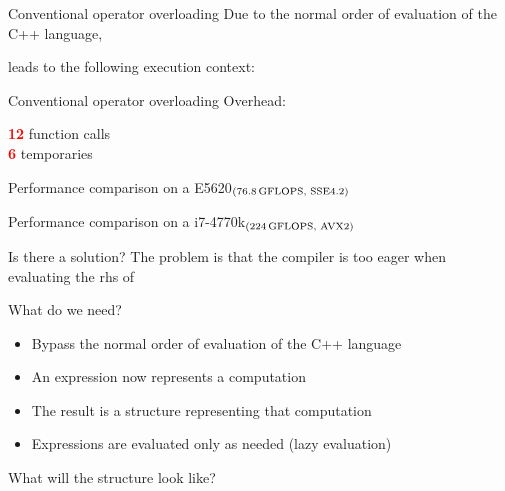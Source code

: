 \documentclass{beamer}
\begin{document}
\begin{frame}{Conventional operator overloading}
	Due to the normal order of evaluation of the C++ language,
	
	
	leads to the following execution context:
	
\end{frame}

\begin{frame}{Conventional operator overloading}
	Overhead: \\
	\begin{center}
		\textcolor{red}{\textbf{12}} function calls\\
		\textcolor{red}{\textbf{6}} temporaries
	\end{center}
\end{frame}

\begin{frame}{Performance comparison on a \small E5620$_{(\small76.8\,\text{GFLOPS, SSE4.2})}$} 
	
\end{frame}

\begin{frame}{Performance comparison on a \small i7-4770k$_{(\small224\,\text{GFLOPS, AVX2})}$} 
	
\end{frame}

\begin{frame}{Is there a solution?}
	The problem is that the compiler is too eager when evaluating the rhs of
	
	What do we need?
	\begin{itemize}
		\item Bypass the normal order of evaluation of the C++ language
		\item An expression now represents a computation 
		\item The result is a structure representing that computation
		\item Expressions are evaluated only as needed (lazy evaluation)
	\end{itemize}
	What will the structure look like?
	
\end{frame}
\end{document}
